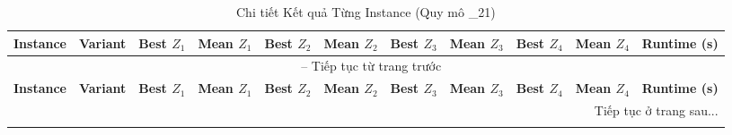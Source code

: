 \setlength{\tabcolsep}{3pt}
\setlength{\LTleft}{0pt}
\setlength{\LTright}{0pt}
\begin{longtable}{@{\extracolsep{\fill}}llccccccccc@{}}
\caption{Chi tiết Kết quả Từng Instance (Quy mô \_21)} \label{tab:instance_details} \\
\toprule
\textbf{Instance} & \textbf{Variant} & \textbf{Best $Z_1$} & \textbf{Mean $Z_1$} & \textbf{Best $Z_2$} & \textbf{Mean $Z_2$} & \textbf{Best $Z_3$} & \textbf{Mean $Z_3$} & \textbf{Best $Z_4$} & \textbf{Mean $Z_4$} & \textbf{Runtime (s)} \\
\midrule
\endfirsthead

\multicolumn{11}{c}{\tablename\ \thetable{} -- Tiếp tục từ trang trước} \\
\toprule
\textbf{Instance} & \textbf{Variant} & \textbf{Best $Z_1$} & \textbf{Mean $Z_1$} & \textbf{Best $Z_2$} & \textbf{Mean $Z_2$} & \textbf{Best $Z_3$} & \textbf{Mean $Z_3$} & \textbf{Best $Z_4$} & \textbf{Mean $Z_4$} & \textbf{Runtime (s)} \\
\midrule
\endhead

\midrule \multicolumn{11}{r}{Tiếp tục ở trang sau...} \\
\endfoot

\bottomrule
\endlastfoot


\end{longtable}
